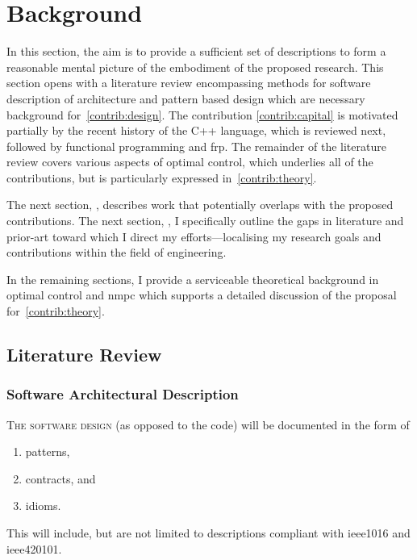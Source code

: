 %
\chapter{Background}%
\label{chap:background}

In this section, the aim is to provide a sufficient set of descriptions to form
a reasonable mental picture of the embodiment of the proposed research. This
section opens with a literature review encompassing methods for software
description of architecture and pattern based design which are necessary
background for~\ref{contrib:design}. The contribution \ref{contrib:capital} is
motivated partially by the recent history of the C++ language, which is reviewed
next, followed by functional programming and \ac{frp}. The remainder of the
literature review covers various aspects of optimal control, which underlies all
of the contributions, but is particularly expressed in~\ref{contrib:theory}.

The next section, , describes work that potentially overlaps
with the proposed contributions. The next section, , I
specifically outline the gaps in literature and prior-art toward which I direct
my efforts—localising my research goals and contributions within the field of
engineering.

In the remaining sections, I provide a serviceable theoretical background in
optimal control and \ac{nmpc} which supports a detailed discussion of the
proposal for~\ref{contrib:theory}.



\section{Literature Review}%
\label{sec:lit-review}


\subsection{Software Architectural Description}


\textsc{The software design} (as opposed to the code) will be documented in the
form of
%
\begin{enumerate}
  \item patterns,
  \item contracts, and
  \item idioms.
\end{enumerate}
%
This will include, but are not limited to descriptions compliant with
\acf{ieee1016} and \acf{ieee420101}.

